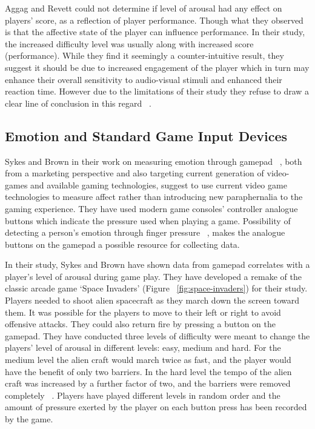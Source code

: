 Aggag and Revett could not determine if level of arousal had any effect on players' score, as a reflection of player performance. Though what they observed is that the affective state of the player can influence performance. In their study, the increased difficulty level was usually along with increased score (performance). While they find it seemingly a counter-intuitive result, they suggest it should be due to increased engagement of the player which in turn may enhance their overall sensitivity to audio-visual stimuli and enhanced their reaction time. However due to the limitations of their study they refuse to draw a clear line of conclusion in this regard ~\cite{aggag2011affective}.

\subsection{Emotion and Standard Game Input Devices}
Sykes and Brown in their work on measuring emotion through gamepad ~\cite{sykes2003affective}, both from a marketing perspective and also targeting current generation of video-games and available gaming technologies, suggest to use current video game technologies to measure affect rather than introducing new paraphernalia to the gaming experience. They have used modern game consoles' controller analogue buttons which indicate the pressure used when playing a game. Possibility of detecting a person's emotion through finger pressure ~\cite{clynes1977sentics}, makes the analogue buttons on the gamepad a possible resource for collecting data.

In their study, Sykes and Brown have shown data from gamepad correlates with a player's level of arousal during game play. They have developed a remake of the classic arcade game `Space Invaders' (Figure ~\ref{fig:space-invaders}) for their study. Players needed to shoot alien spacecraft as they march down the screen toward them. It was possible for the players to move to their left or right to avoid offensive attacks. They could also return fire by pressing a button on the gamepad. They have conducted three levels of difficulty were meant to change the players' level of arousal in different levels: easy, medium and hard. For the medium level the alien craft would march twice as fast, and the player would have the benefit of only two barriers. In the hard level the tempo of the alien craft was increased by a further factor of two, and the barriers were removed completely ~\cite{sykes2003affective}. Players have played different levels in random order and the amount of pressure exerted by the player on each button press has been recorded by the game.


